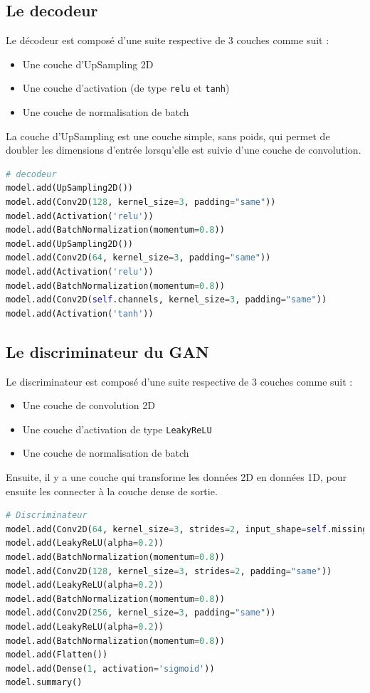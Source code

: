 \documentclass[11pt,a4paper]{article}
\begin{document}
        \subsection{Le decodeur}
            Le décodeur est composé d'une suite respective de 3 couches comme suit :
		    \begin{itemize}[noitemsep]
	            \item Une couche d'UpSampling 2D
	            \item Une couche d'activation (de type \texttt{relu} et \texttt{tanh})
	            \item Une couche de normalisation de batch
            \end{itemize}
La couche d'UpSampling est une couche simple, sans poids, qui permet de doubler les dimensions d'entrée lorsqu'elle est suivie d'une couche de convolution.            
            \begin{lstlisting}[language=Python, caption=Code Python du decodeur]
# decodeur
model.add(UpSampling2D())
model.add(Conv2D(128, kernel_size=3, padding="same"))
model.add(Activation('relu'))
model.add(BatchNormalization(momentum=0.8))
model.add(UpSampling2D())
model.add(Conv2D(64, kernel_size=3, padding="same"))
model.add(Activation('relu'))
model.add(BatchNormalization(momentum=0.8))
model.add(Conv2D(self.channels, kernel_size=3, padding="same"))
model.add(Activation('tanh'))\end{lstlisting}

        \subsection{Le discriminateur du GAN}
            Le discriminateur est composé d'une suite respective de 3 couches comme suit :
		    \begin{itemize}[noitemsep]
	            \item Une couche de convolution 2D
	            \item Une couche d'activation de type \texttt{LeakyReLU}
	            \item Une couche de normalisation de batch
            \end{itemize}
            Ensuite, il y a une couche qui transforme les données 2D en données 1D, pour ensuite les connecter à la couche dense de sortie.
            \begin{lstlisting}[language=Python, caption=Code Python du discriminateur]
# Discriminateur
model.add(Conv2D(64, kernel_size=3, strides=2, input_shape=self.missing_shape, padding="same"))
model.add(LeakyReLU(alpha=0.2))
model.add(BatchNormalization(momentum=0.8))
model.add(Conv2D(128, kernel_size=3, strides=2, padding="same"))
model.add(LeakyReLU(alpha=0.2))
model.add(BatchNormalization(momentum=0.8))
model.add(Conv2D(256, kernel_size=3, padding="same"))
model.add(LeakyReLU(alpha=0.2))
model.add(BatchNormalization(momentum=0.8))
model.add(Flatten())
model.add(Dense(1, activation='sigmoid'))
model.summary()\end{lstlisting}
\end{document}

